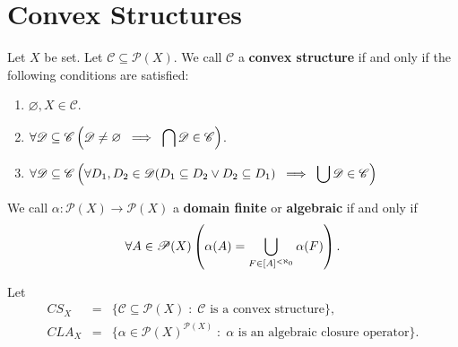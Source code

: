 \documentclass{amsart}
\begin{document}

\section{Convex Structures} %
\begin{definition}
Let \(X\) be set.
Let \(\mathscr{C} \subseteq \mathscr{P} (X)\).
We call \(\mathscr{C}\) a \textbf{convex structure} if and only if
the following conditions are satisfied:
\begin{enumerate}
	\item \(\varnothing , X \in \mathscr{C}\).
	\item \(\forall \mathscr{D} \subseteq \mathscr{C}
	\left(\mathscr{D} \ne \varnothing
		 \;\implies\; \displaystyle\bigcap \mathscr{D} \in \mathscr{C} \right)\).
	\item \(\forall \mathscr{D} \subseteq \mathscr{C} \left(
	\forall D_1,D_2 \in \mathscr{D} (D_1 \subseteq D_2 \lor D_2 \subseteq D_1 )
	\;\implies\; \displaystyle\bigcup \mathscr{D} \in \mathscr{C} 
	\right)\)
\end{enumerate}
\end{definition}

\begin{definition}
We call \(\alpha : \mathscr{P} (X) \longrightarrow \mathscr{P} (X)\) a 
\textbf{domain finite} or \textbf{algebraic} if and only if
\[
	\forall A \in \mathscr{P} (X)
	\left(
	\alpha (A) = \displaystyle\bigcup_{F \in [A] ^{< \aleph _0}} \alpha (F)
	\right).
\]
\end{definition}

\begin{definition}
	Let
	\[
		\begin{array}{rcl}
		CS_X & = & 
		\{\mathscr{C} \subseteq \mathscr{P} (X) \;:\; \mathscr{C} 
		\mbox{ is a convex structure} \},
		\\
		CLA_X & = & 
		\{\alpha  \in \mathscr{P} (X) ^ {\mathscr{P} (X)} \;:\; 
			\alpha \mbox{ is an algebraic closure operator}\}.
		\end{array}
	\]
\end{definition}
\end{document}

